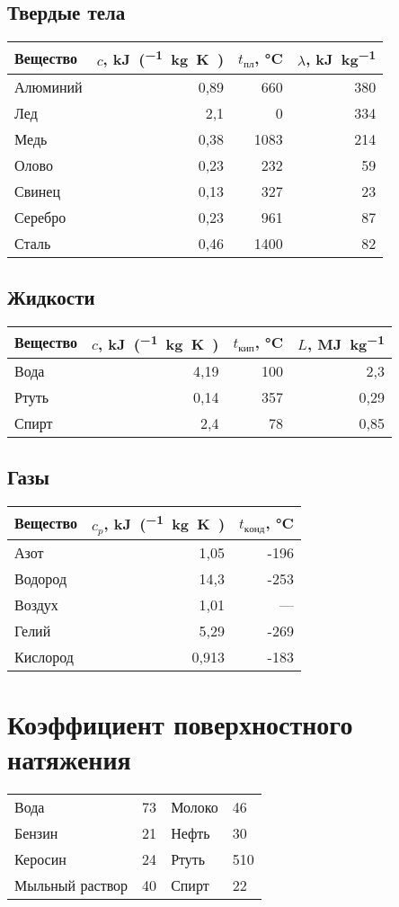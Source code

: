 \documentclass[a4paper,12pt]{article}
\begin{document}
\subsection*{Твердые тела}
\begin{tabular}{@{}lrrr@{}}
\toprule
Вещество & $c$, \si{\kilo\joule\per(\kg\kelvin)} & $t_{пл}$, \si{\celsius} & $\lambda$, \si{\kilo\joule\per\kg} \\
\midrule
Алюминий & 0,89 & 660 & 380 \\
Лед & 2,1 & 0 & 334 \\
Медь & 0,38 & 1083 & 214 \\
Олово & 0,23 & 232 & 59 \\
Свинец & 0,13 & 327 & 23 \\
Серебро & 0,23 & 961 & 87 \\
Сталь & 0,46 & 1400 & 82 \\
\bottomrule
\end{tabular}

\subsection*{Жидкости}
\begin{tabular}{@{}lrrr@{}}
\toprule
Вещество & $c$, \si{\kilo\joule\per(\kg\kelvin)} & $t_{кип}$, \si{\celsius} & $L$, \si{\mega\joule\per\kg} \\
\midrule
Вода & 4,19 & 100 & 2,3 \\
Ртуть & 0,14 & 357 & 0,29 \\
Спирт & 2,4 & 78 & 0,85 \\
\bottomrule
\end{tabular}

\subsection*{Газы}
\begin{tabular}{@{}lrr@{}}
\toprule
Вещество & $c_p$, \si{\kilo\joule\per(\kg\kelvin)} & $t_{конд}$, \si{\celsius} \\
\midrule
Азот & 1,05 & -196 \\
Водород & 14,3 & -253 \\
Воздух & 1,01 & — \\
Гелий & 5,29 & -269 \\
Кислород & 0,913 & -183 \\
\bottomrule
\end{tabular}

\section*{Коэффициент поверхностного натяжения}
\begin{tabular}{@{}llll@{}}
\toprule
Вода & 73 & Молоко & 46 \\
Бензин & 21 & Нефть & 30 \\
Керосин & 24 & Ртуть & 510 \\
Мыльный раствор & 40 & Спирт & 22 \\
\bottomrule
\end{tabular}
\end{document}
